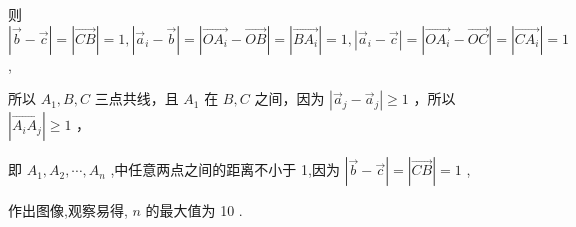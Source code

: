 \documentclass[10pt]{article}
\begin{document}
则 \(\left| {\overrightarrow{b} - \overrightarrow{c}}\right|  = \left| \overrightarrow{CB}\right|  = 1,\left| {{\overrightarrow{a}}_{i} - \overrightarrow{b}}\right|  = \left| {\overrightarrow{O{A}_{i}} - \overrightarrow{OB}}\right|  = \left| \overrightarrow{B{A}_{i}}\right|  = 1,\left| {{\overrightarrow{a}}_{i} - \overrightarrow{c}}\right|  = \left| {\overrightarrow{O{A}_{i}} - \overrightarrow{OC}}\right|  = \left| \overrightarrow{C{A}_{i}}\right|  = 1\) ,

所以 \({A}_{1},B,C\) 三点共线，且 \({A}_{1}\) 在 \(B,C\) 之间，因为 \(\left| {{\overrightarrow{a}}_{j} - {\overrightarrow{a}}_{j}}\right|  \geq  1\) ，所以 \(\left| \overrightarrow{{A}_{i}{A}_{j}}\right|  \geq  1\) ，

即 \({A}_{1},{A}_{2},\cdots ,{A}_{n}\) ,中任意两点之间的距离不小于 1,因为 \(\left| {\overrightarrow{b} - \overrightarrow{c}}\right|  = \left| \overrightarrow{CB}\right|  = 1\) ,

作出图像,观察易得, \(n\) 的最大值为 10 .
\end{document}
